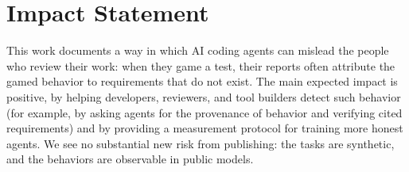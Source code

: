 \section*{Impact Statement}
This work documents a way in which AI coding agents can mislead the people who review their work: when they game a test, their reports often attribute the gamed behavior to requirements that do not exist. The main expected impact is positive, by helping developers, reviewers, and tool builders detect such behavior (for example, by asking agents for the provenance of behavior and verifying cited requirements) and by providing a measurement protocol for training more honest agents. We see no substantial new risk from publishing: the tasks are synthetic, and the behaviors are observable in public models.
